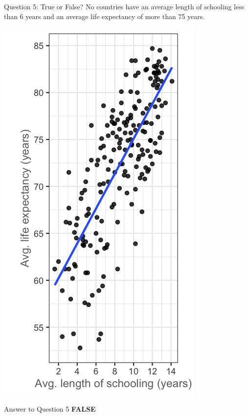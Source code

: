 \documentclass[
  ignorenonframetext,
]{beamer}
\begin{document}
\begin{frame}{Question 5: True or False?}
\label{question-5-true-or-false}
No countries have an average length of schooling less than 6 years and
an average life expectancy of more than 75 years.

\includegraphics{../images/im40.png}
\end{frame}

\begin{frame}{Answer to Question 5}
\label{answer-to-question-5}
\textbf{FALSE}
\end{frame}
\end{document}
